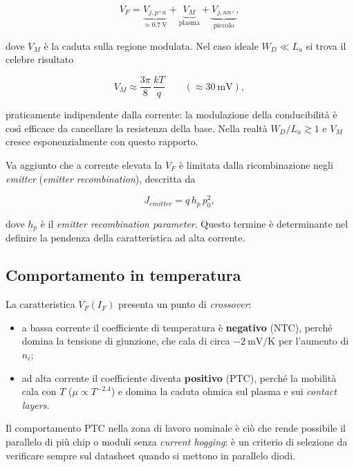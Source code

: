 \begin{equation}
V_F = \underbrace{V_{j,p^{+}n}}_{\approx \SI{0.7}{\volt}}
+ \underbrace{V_{M}}_{\text{plasma}}
+ \underbrace{V_{j,nn^{+}}}_{\text{piccolo}} ,
\end{equation}

dove $V_M$ è la caduta sulla regione modulata. Nel caso ideale
$W_D \ll L_a$ si trova il celebre risultato

\begin{equation}
V_{M} \approx \frac{3\pi}{8}\,\frac{kT}{q}
\qquad (\approx \SI{30}{\milli\volt}),
\end{equation}

praticamente indipendente dalla corrente: la modulazione della conducibilità è
così efficace da cancellare la resistenza della base. Nella realtà
$W_D / L_a \gtrsim 1$ e $V_M$ cresce esponenzialmente con questo rapporto.

Va aggiunto che a corrente elevata la $V_F$ è limitata dalla ricombinazione
negli \emph{emitter} (\emph{emitter recombination}), descritta da

\begin{equation}
J_{emitter} = q\, h_{p}\, p_{0}^{2},
\end{equation}

dove $h_p$ è il \emph{emitter recombination parameter}. Questo termine è
determinante nel definire la pendenza della caratteristica ad alta corrente.

\subsection{Comportamento in temperatura}

La caratteristica $V_F(I_F)$ presenta un punto di \emph{crossover}:

\begin{itemize}
\item a bassa corrente il coefficiente di temperatura è \textbf{negativo}
(NTC), perché domina la tensione di giunzione, che cala di circa
$-\SI{2}{\milli\volt\per\kelvin}$ per l'aumento di $n_i$;
\item ad alta corrente il coefficiente diventa \textbf{positivo} (PTC), perché
la mobilità cala con $T$ ($\mu \propto T^{-2.4}$) e domina la caduta ohmica sul
plasma e sui \emph{contact layers}.
\end{itemize}

Il comportamento PTC nella zona di lavoro nominale è ciò che rende possibile il
parallelo di più chip o moduli senza \emph{current hogging}: è un criterio di
selezione da verificare sempre sul datasheet quando si mettono in parallelo
diodi.

